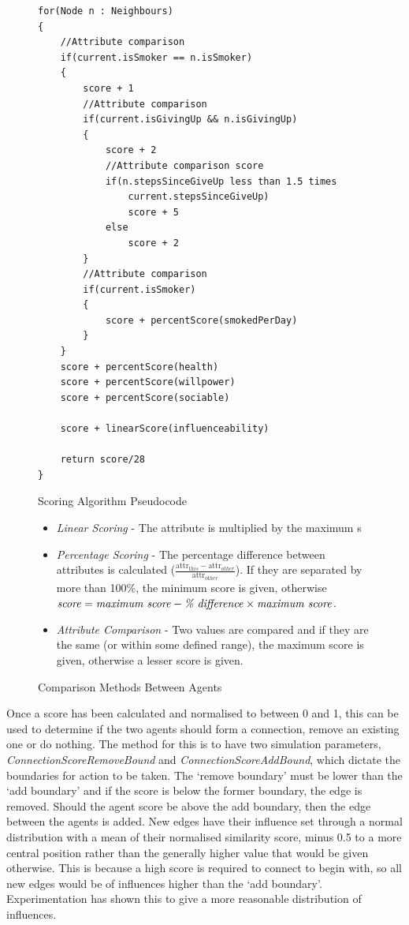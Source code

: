 \documentclass[]{report}
\begin{document}
\begin{figure}
\begin{center}
	\begin{lstlisting}
for(Node n : Neighbours)
{
	//Attribute comparison
	if(current.isSmoker == n.isSmoker)
	{
		score + 1
		//Attribute comparison
		if(current.isGivingUp && n.isGivingUp)
		{
			score + 2
			//Attribute comparison score
			if(n.stepsSinceGiveUp less than 1.5 times 
				current.stepsSinceGiveUp)
				score + 5
			else
				score + 2
		}
		//Attribute comparison
		if(current.isSmoker)
		{
			score + percentScore(smokedPerDay) 
		}
	}
	score + percentScore(health)
	score + percentScore(willpower)
	score + percentScore(sociable)

	score + linearScore(influenceability)

	return score/28
}
	\end{lstlisting}
\end{center}

\caption{Scoring Algorithm Pseudocode}
\label{code:scoring}
\end{figure}

\begin{figure}

\begin{itemize}
\item \emph{Linear Scoring} - The attribute is multiplied by the maximum s
\item \emph{Percentage Scoring} - The percentage difference between attributes is calculated ($\frac{\text{attr}_{this}-\text{attr}_{other}}{\text{attr}_{other}}$). If they are separated by more than 100\%, the minimum score is given, otherwise $\text{\emph{score}} = \text{\emph{maximum score}} - \text{\emph{\% difference}} \times \text{\emph{maximum score}}$.
\item \emph{Attribute Comparison} - Two values are compared and if they are the same (or within some defined range), the maximum score is given, otherwise a lesser score is given.
\end{itemize}
\caption{Comparison Methods Between Agents}
\label{code:comp-methods}
\end{figure}

Once a score has been calculated and normalised to between 0 and 1, this can be used to determine if the two agents should form a connection, remove an existing one or do nothing. The method for this is to have two simulation parameters, \emph{ConnectionScoreRemoveBound} and \emph{ConnectionScoreAddBound}, which dictate the boundaries for action to be taken. The `remove boundary’ must be lower than the `add boundary’ and if the score is below the former boundary, the edge is removed. Should the agent score be above the add boundary, then the edge between the agents is added. New edges have their influence set through a normal distribution with a mean of their normalised similarity score, minus 0.5 to a more central position rather than the generally higher value that would be given otherwise. This is because a high score is required to connect to begin with, so all new edges would be of influences higher than the `add boundary'. Experimentation has shown this to give a more reasonable distribution of influences.
\end{document}
